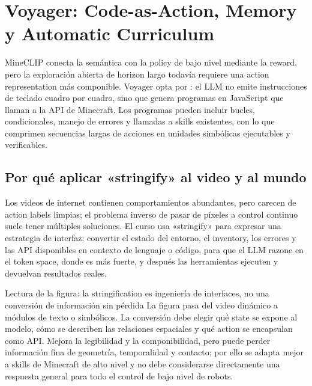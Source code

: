 \section{Voyager: Code-as-Action, Memory y Automatic Curriculum}

MineCLIP conecta la semántica con la policy de bajo nivel mediante la reward, pero la exploración abierta de horizon largo todavía requiere una action representation más componible. Voyager opta por : el LLM no emite instrucciones de teclado cuadro por cuadro, sino que genera programas en JavaScript que llaman a la API de Minecraft. Los programas pueden incluir bucles, condicionales, manejo de errores y llamadas a skills existentes, con lo que comprimen secuencias largas de acciones en unidades simbólicas ejecutables y verificables.

\subsection{Por qué aplicar «stringify» al video y al mundo}

Los videos de internet contienen comportamientos abundantes, pero carecen de action labels limpias; el problema inverso de pasar de píxeles a control continuo suele tener múltiples soluciones. El curso usa «stringify» para expresar una estrategia de interfaz: convertir el estado del entorno, el inventory, los errores y las API disponibles en contexto de lenguaje o código, para que el LLM razone en el token space, donde es más fuerte, y después las herramientas ejecuten y devuelvan resultados reales.


\begin{knowledgebox}{Lectura de la figura: la stringification es ingeniería de interfaces, no una conversión de información sin pérdida}
La figura pasa del video dinámico a módulos de texto o simbólicos. La conversión debe elegir qué state se expone al modelo, cómo se describen las relaciones espaciales y qué action se encapsulan como API. Mejora la legibilidad y la componibilidad, pero puede perder información fina de geometría, temporalidad y contacto; por ello se adapta mejor a skills de Minecraft de alto nivel y no debe considerarse directamente una respuesta general para todo el control de bajo nivel de robots.
\end{knowledgebox}

